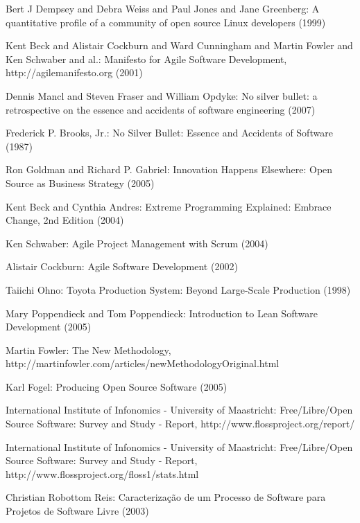 \documentclass[lnbip]{svmultln}
\begin{document}
\begin{thebibliography}{5}

 Bert J Dempsey and Debra Weiss and Paul
  Jones and Jane Greenberg: A quantitative profile of a community of
  open source Linux developers (1999)

 Kent Beck and Alistair Cockburn and Ward
  Cunningham and Martin Fowler and Ken Schwaber and al.: Manifesto for
  Agile Software Development, http://agilemanifesto.org (2001)

 Dennis Mancl and Steven Fraser and
  William Opdyke: No silver bullet: a retrospective on the essence and
  accidents of software engineering (2007)

 Frederick P. Brooks, Jr.: No Silver Bullet:
  Essence and Accidents of Software (1987)

 Ron Goldman and Richard P. Gabriel: Innovation
  Happens Elsewhere: Open Source as Business Strategy (2005)

 Kent Beck and Cynthia Andres: Extreme Programming
  Explained: Embrace Change, 2nd Edition (2004)

 Ken Schwaber: Agile Project Management with
  Scrum (2004)

 Alistair Cockburn: Agile Software Development
  (2002)

 Taiichi Ohno: Toyota Production System: Beyond
  Large-Scale Production (1998)

 Mary Poppendieck and Tom Poppendieck:
  Introduction to Lean Software Development (2005)

 Martin Fowler: The New Methodology,
  http://martinfowler.com/articles/newMethodologyOriginal.html

 Karl Fogel: Producing Open Source Software (2005)

 International Institute of Infonomics -
  University of Maastricht: Free/Libre/Open Source Software: Survey
  and Study - Report, http://www.flossproject.org/report/

 International Institute of Infonomics -
  University of Maastricht: Free/Libre/Open Source Software: Survey
  and Study - Report, http://www.flossproject.org/floss1/stats.html

 Christian Robottom Reis: Caracteriza\c{c}\~{a}o de
  um Processo de Software para Projetos de Software Livre (2003)


\end{thebibliography}
\end{document}
